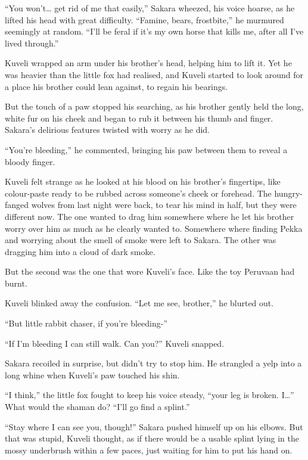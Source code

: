 ``You won't\ldots{} get rid of me that easily,'' Sakara wheezed, his voice hoarse, as he lifted his head with great difficulty. ``Famine, bears, frostbite,'' he murmured seemingly at random. ``I'll be feral if it's my own horse that kills me, after all I've lived through.''

Kuveli wrapped an arm under his brother's head, helping him to lift it. Yet he was heavier than the little fox had realised, and Kuveli started to look around for a place his brother could lean against, to regain his bearings.

But the touch of a paw stopped his searching, as his brother gently held the long, white fur on his cheek and began to rub it between his thumb and finger. Sakara's delirious features twisted with worry as he did.

``You're bleeding,'' he commented, bringing his paw between them to reveal a bloody finger.

Kuveli felt strange as he looked at his blood on his brother's fingertips, like colour-paste ready to be rubbed across someone's cheek or forehead. The hungry-fanged wolves from last night were back, to tear his mind in half, but they were different now. The one wanted to drag him somewhere where he let his brother worry over him as much as he clearly wanted to. Somewhere where finding Pekka and worrying about the smell of smoke were left to Sakara. The other was dragging him into a cloud of dark smoke.

But the second was the one that wore Kuveli's face. Like the toy Peruvaan had burnt.

Kuveli blinked away the confusion. ``Let me see, brother,'' he blurted out.

``But little rabbit chaser, if you're bleeding-''

``If I'm bleeding I can still walk. Can you?'' Kuveli snapped.

Sakara recoiled in surprise, but didn't try to stop him. He strangled a yelp into a long whine when Kuveli's paw touched his shin.

``I think,'' the little fox fought to keep his voice steady, ``your leg is broken. I\ldots'' What would the shaman do? ``I'll go find a splint.''

``Stay where I can see you, though!'' Sakara pushed himself up on his elbows. But that was stupid, Kuveli thought, as if there would be a usable splint lying in the mossy underbrush within a few paces, just waiting for him to put his hand on.

